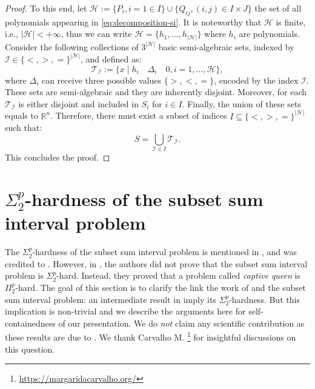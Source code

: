 \documentclass{article}
\newcommand*{\cH}{\mathcal{H}}
\newcommand*{\cI}{\mathcal{I}}
\newcommand*{\cT}{\mathcal{T}}
\newcommand*{\RR}{\mathbb{R}}
\newcommand{\existleveltwo}{\Sigma_2^p}
\theoremstyle{plain}
\theoremstyle{definition}
\begin{document}
\begin{appendices}
\begin{proof}
    To this end, let $\cH:= \{P_i, i = 1 \in I\} \cup \{Q_{ij}, (i,j) \in I \times J\}$ the set of all polynomials appearing in \eqref{eq:decomposition-si}. It is noteworthy that $\cH$ is finite, i.e., $|\cH| < +\infty$, thus we can write $\cH = \{h_1, \ldots, h_{|\cH|}\}$ where $h_i$ are polynomials. Consider the following collections of $3^{|\cH|}$ basic semi-algebraic sets, indexed by $\cI \in \{<, >, =\}^{|\cH|}$, and defined as:
    \begin{equation*}
        \cT_\cI := \{x \mid h_i \quad \Delta_i \quad 0, i = 1, \ldots, \cH\},
    \end{equation*}
    where $\Delta_i$ can receive three possible values $\{>, <, =\}$, encoded by the index $\cI$. These sets are semi-algebraic and they are inherently disjoint. Moreover, for each $\cT_\cI$ is either disjoint and included in $S_i$ for $i \in I$. Finally, the union of these sets equals to $\RR^n$. Therefore, there must exist a subset of indices $I \subseteq \{<, >, =\}^{|\cH|}$ such that:
    \begin{equation*}
        S = \bigcup_{\cI \in I} \cT_\cI.
    \end{equation*}
    This concludes the proof.
\end{proof}

\section{$\existleveltwo$-hardness of the subset sum interval problem}
\label{sec:subsetSumSigma2pHard}
The $\existleveltwo$-hardness of the subset sum interval problem is mentioned in \cite{caprara2014study}, and was credited to \cite{eggermont2012motion}. However, in \cite{eggermont2012motion}, the authors did not prove that the subset sum interval problem is $\existleveltwo$-hard. Instead, they proved that a problem called \emph{captive queen} is $\Pi^p_2$-hard. The goal of this section is to clarify the link the work of \cite{eggermont2012motion} and the subset sum interval problem: an intermediate result in \cite{eggermont2012motion} imply its $\existleveltwo$-hardness. But this implication is non-trivial and we describe the arguments here for self-containedness of our presentation. We do \emph{not} claim any scientific contribution as these results are due to \cite{eggermont2012motion,caprara2014study}. We thank Carvalho M. \footnote{\url{https://margaridacarvalho.org/}} for insightful discussions on this question.


\end{appendices}
\end{document}
